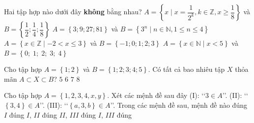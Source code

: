 \begin{ex}%
	Hai tập hợp nào dưới  đây \textbf{không} bằng nhau?
	 \choice
		{\True $A=\left\{x\mid x=\dfrac{1}{2^k}, k\in \mathbb{Z},x\ge \dfrac{1}{8}  \right\}$ và $B=\left\{\dfrac{1}{2};\dfrac{1}{4};\dfrac{1}{8} \right\}$}
		{$A=\left\{3;9;27;81\right\}$ và $B=\left\{3^n\mid  n\in \mathbb{N},1\le n\le 4\right\}$}
		{$A=\left\{x\in \mathbb{Z}\mid -2< x\le 3\right\}$ và  $B=\left\{-1;0;1;2;3\right\}$}
		{$A=\left\{x\in \mathbb{N}\mid x <  5\right\}$ và $B=\left\{0;\; 1;\; 2;\; 3;\; 4\right\}$}
\end{ex}

\begin{ex}%
	Cho tập hợp $A=\left\{1;2\right\}$ và $B=\left\{1;2;3;4;5\right\}$. Có tất cả bao nhiêu tập $X$  thỏa mãn $A\subset X\subset B$?
	\choice 
		 {$5$}
		 {$6$}
		 {$7$}
		{\True $8$} 
\end{ex}

\begin{ex}%
	Cho tập hợp $A=\left\{1,2,3,4,x,y\right\}$. Xét các mệnh  đề sau đây (I): \lq\lq $3\in A$\rq\rq. (II): \lq\lq $\left\{3,4\right\}\in A$\rq\rq. (III): \lq\lq $\left\{a,3,b\right\}\in A $\rq\rq. Trong các mệnh đề sau, mệnh đề nào đúng
	 \choice
		{\True $I$ đúng} 
		 {$I$, $II$ đúng}
		 {$II$, $III$ đúng}
		 {$I$, $III$ đúng}
\end{ex}

